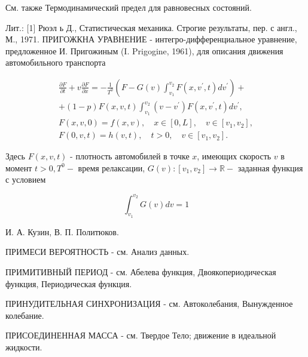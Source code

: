 \documentclass[10pt]{article}
\begin{document}
См. также Термодинамический предел для равновесных состояний.



Лит.: [1] Рюэл ь Д., Статистическая механика. Строгие результаты, пер. с англ., М., 1971. ПРИГОЖКНА УРАВНЕНИЕ - интегро-дифференциальное уравнение, предложенное И. Пригожиным (I. Prigogine, 1961), для описания движения автомобильного транспорта



\[

\begin{gathered}

\frac{\partial F}{\partial t}+v \frac{\partial F}{\partial x}=-\frac{1}{T^{0}}\left(F-G(v) \int_{v_{1}}^{v_{2}} F\left(x, v^{\prime}, t\right) d v^{\prime}\right)+ \\

+(1-p) F(x, v, t) \int_{v_{1}}^{v_{2}}\left(v-v^{\prime}\right) F\left(x, v^{\prime}, t\right) d v^{\prime}, \\

F(x, v, 0)=f(x, v), \quad x \in[0, L], \quad v \in\left[v_{1}, v_{2}\right], \\

F(0, v, t)=h(v, t), \quad t>0, \quad v \in\left[v_{1}, v_{2}\right] .

\end{gathered}

\]



Здесь $F(x, v, t)$ - плотность автомобилей в точке $x$, имеющих скорость $v$ в момент $t>0, T^{0}-$ время релаксации, $G(v):\left[v_{1}, v_{2}\right] \rightarrow \mathbb{R}-$ заданная функция с условием



\[

\int_{v_{1}}^{v_{2}} G(v) d v=1

\]



И. А. Кузин, В. П. Политюков.



ПРИМЕСИ ВЕРОЯТНОСТЬ - см. Анализ данных.



ПРИМИТИВНЫЙ ПЕРИОД - см. Абелева функция, Двоякопериодическая функция, Периодическая функция.



ПРИНУДИТЕЛЬНАЯ СИНХРОНИЗАЦИЯ - см. Автоколебания, Вынужденное колебание.



ПРИСОЕДИНЕННАЯ МАССА - см. Твердое Тело; движение в идеальной жидкости.
\end{document}
